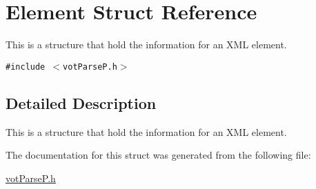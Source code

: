 \hypertarget{structElement}{
\section{Element Struct Reference}
\label{structElement}
}
This is a structure that hold the information for an XML element.  


{\tt \#include $<$votParseP.h$>$}



\subsection{Detailed Description}
This is a structure that hold the information for an XML element. 

The documentation for this struct was generated from the following file:\begin{CompactItemize}
\item 
\hyperlink{votParseP_8h}{votParseP.h}\end{CompactItemize}
